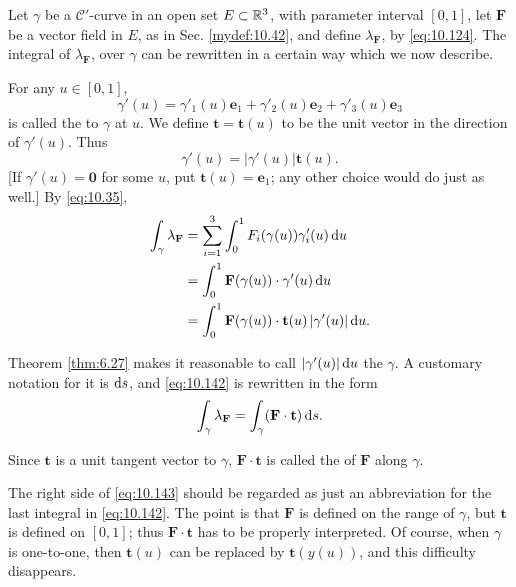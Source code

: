 \begin{mydef}
    \label{mydef:10.48}
    Let $\gamma$ be a $\mathscr{C}'$-curve in an open set $E \subset {\protect\mathbb R}^3$, with parameter interval $[0, 1]$, 
    let $\mathbf{F}$ be a vector field in $E$, as in Sec. \ref{mydef:10.42}, 
    and define $\lambda_{\mathbf{F}}$, by \eqref{eq:10.124}. 
    The integral of $\lambda_{\mathbf{F}}$, over $\gamma$ can be rewritten in a certain way which we now describe.

    For any $u \in [0,1]$,
    \begin{equation*}
        \gamma' (u) = 
        \gamma'_1 (u) \mathbf{e}_1 +
        \gamma'_2 (u) \mathbf{e}_2 +
        \gamma'_3 (u) \mathbf{e}_3 
    \end{equation*}
    is called the  to $\gamma$ at $u$. 
    We define $\mathbf{t} = \mathbf{t}(u)$ to be the unit vector in the direction of $\gamma'(u)$. 
    Thus
    \begin{equation*}
        \gamma'(u) = \left| \gamma'(u) \right| \mathbf{t} (u) .
    \end{equation*}
    [If $\gamma'(u) = \mathbf{0}$ for some $u$, 
    put $\mathbf{t}(u) = \mathbf{e}_1$; 
    any other choice would do just as well.]
    By \eqref{eq:10.35},
    \begin{equation}
        \label{eq:10.142}
        \begin{aligned}
            \int_{\gamma} \lambda_{\mathbf{F}}
            &= \sum_{i=1}^{3} \int_{0}^{1} F_i (\gamma(u)) \gamma'_i(u) \d u \\
            &= \int_{0}^{1} \mathbf{F} (\gamma(u)) \cdot \gamma'(u) \d u \\
            &= \int_{0}^{1} \mathbf{F} (\gamma(u)) \cdot \mathbf{t}(u) \left| \gamma'(u) \right| \d u .
        \end{aligned}
    \end{equation}

    Theorem \ref{thm:6.27} makes it reasonable to call $| \gamma'(u) | \d u$ the  $\gamma$. 
    A customary notation for it is $\d s$, and \eqref{eq:10.142} is rewritten in the form
    \begin{equation}
        \label{eq:10.143}
        \int_{\gamma} \lambda_{\mathbf{F}}
        = \int_{\gamma} (\mathbf{F \cdot t}) \d s .
    \end{equation}

    Since $\mathbf{t}$ is a unit tangent vector to $\gamma$, 
    $\mathbf{F \cdot t}$ is called the  of $\mathbf{F}$ along $\gamma$.

    The right side of \eqref{eq:10.143} should be regarded as just an abbreviation for the last integral in \eqref{eq:10.142}. 
    The point is that $\mathbf{F}$ is defined on the range of $\gamma$, but $\mathbf{t}$ is defined on $[0, 1]$; 
    thus $\mathbf{F \cdot t}$ has to be properly interpreted. 
    Of course, when $\gamma$ is one-to-one, 
    then $\mathbf{t}(u)$ can be replaced by $\mathbf{t}(y(u))$, and this difficulty disappears.
\end{mydef}

